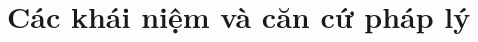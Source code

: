 \documentclass{report} %
\begin{document}
\section{Các khái niệm và căn cứ pháp lý}
% 
% 
% 
% 


\end{document}
